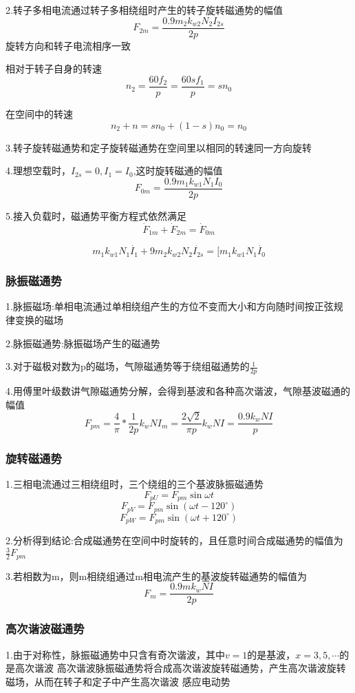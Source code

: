 \documentclass[11pt,twoside,a4paper]{ctexart}
\begin{document}
2.转子多相电流通过转子多相绕组时产生的转子旋转磁通势的幅值
\[F_{2m} = \frac{0.9m_2k_{w2}N_2I_{2s}}{2p}\]
旋转方向和转子电流相序一致

相对于转子自身的转速
\[n_2 = \frac{60f_2}{p} = \frac{60sf_1}{p} = sn_0\]

在空间中的转速
\[n_2 + n = sn_0 + (1 - s)n_0 = n_0\]

3.转子旋转磁通势和定子旋转磁通势在空间里以相同的转速同一方向旋转

4.理想空载时，$I_{2s} = 0,I_1 = I_0$,这时旋转磁通的幅值
\[F_{0m} = \frac{0.9m_1k_{w1}N_1I_0}{2p}\]

5.接入负载时，磁通势平衡方程式依然满足
\[\dot{F}_{1m} + \dot{F}_{2m} = \dot{F}_{0m}\]

\[m_1k_{w1}N_1\dot{I_1} + 9m_2k_{w2}N_2\dot{I_{2s}} = [m_1k_{w1}N_1\dot{I_0}\]

\subsubsection{脉振磁通势}
1.脉振磁场:单相电流通过单相绕组产生的方位不变而大小和方向随时间按正弦规律变换的磁场

2.脉振磁通势:脉振磁场产生的磁通势

3.对于磁极对数为p的磁场，气隙磁通势等于绕组磁通势的$\frac{1}{2p}$

4.用傅里叶级数讲气隙磁通势分解，会得到基波和各种高次谐波，气隙基波磁通的幅值
\[F_{pm} = \frac{4}{\pi }*\frac{1}{2p}k_wNI_m = \frac{2\sqrt 2}{\pi p}k_wNI = \frac{0.9k_wNI}{p}\]

\subsubsection{旋转磁通势}
1.三相电流通过三相绕组时，三个绕组的三个基波脉振磁通势
\[F_{pU} = F_{pm}\sin \omega t\] 
\[F_{pV} = F_{pm}\sin (\omega t - 120^\circ )\]
\[F_{pW} = F_{pm}\sin (\omega t + 120^\circ )\]

2.分析得到结论:合成磁通势在空间中时旋转的，且任意时间合成磁通势的幅值为$\frac{3}{2}F_{pm}$

3.若相数为m，则m相绕组通过m相电流产生的基波旋转磁通势的幅值为
\[F_m = \frac{0.9mk_wNI}{2p}\]

\subsubsection{高次谐波磁通势}
1.由于对称性，脉振磁通势中只含有奇次谐波，其中$v = 1$的是基波，$x = 3,5,\cdots $的是高次谐波
高次谐波脉振磁通势将合成高次谐波旋转磁通势，产生高次谐波旋转磁场，从而在转子和定子中产生高次谐波
感应电动势
\end{document}
